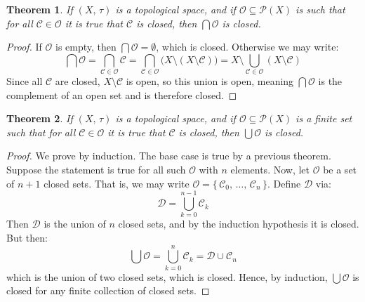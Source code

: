 \documentclass{article}
\theoremstyle{plain}
\newtheorem{theorem}{Theorem}[section]
\theoremstyle{normal}
\begin{document}
        \begin{theorem}
            If $(X,\,\tau)$ is a topological space, and if
            $\mathcal{O}\subseteq\mathcal{P}(X)$ is such that for all
            $\mathcal{C}\in\mathcal{O}$ it is true that $\mathcal{C}$ is closed,
            then $\bigcap\mathcal{O}$ is closed.
        \end{theorem}
        \begin{proof}
            If $\mathcal{O}$ is empty, then $\bigcap\mathcal{O}=\emptyset$,
            which is closed. Otherwise we may write:
            \begin{equation}
                \bigcap\mathcal{O}
                =\bigcap_{\mathcal{C}\in\mathcal{O}}\mathcal{C}
                =\bigcap_{\mathcal{C}\in\mathcal{O}}\Big(
                    X\setminus(X\setminus\mathcal{C})
                \Big)
                =X\setminus\bigcup_{\mathcal{C}\in\mathcal{O}}(
                    X\setminus\mathcal{C}
                )
            \end{equation}
            Since all $\mathcal{C}$ are closed, $X\setminus\mathcal{C}$ is open,
            so this union is open, meaning $\bigcap\mathcal{O}$ is the
            complement of an open set and is therefore closed.
        \end{proof}
        \begin{theorem}
            If $(X,\,\tau)$ is a topological space, and if
            $\mathcal{O}\subseteq\mathcal{P}(X)$ is a finite set such that for
            all $\mathcal{C}\in\mathcal{O}$ it is true that $\mathcal{C}$ is
            closed, then $\bigcup\mathcal{O}$ is closed.
        \end{theorem}
        \begin{proof}
            We prove by induction. The base case is true by a previous
            theorem. Suppose the statement is true for all such $\mathcal{O}$
            with $n$ elements. Now, let $\mathcal{O}$ be a set of $n+1$ closed
            sets. That is, we may write
            $\mathcal{O}=\{\,\mathcal{C}_{0},\,\dots,\,\mathcal{C}_{n}\,\}$.
            Define $\mathcal{D}$ via:
            \begin{equation}
                \mathcal{D}=\bigcup_{k=0}^{n-1}\mathcal{C}_{k}
            \end{equation}
            Then $\mathcal{D}$ is the union of $n$ closed sets, and by
            the induction hypothesis it is closed. But then:
            \begin{equation}
                \bigcup\mathcal{O}
                =\bigcup_{k=0}^{n}\mathcal{C}_{k}
                =\mathcal{D}\cup\mathcal{C}_{n}
            \end{equation}
            which is the union of two closed sets, which is closed. Hence,
            by induction, $\bigcup\mathcal{O}$ is closed for any finite
            collection of closed sets.
        \end{proof}
\end{document}
